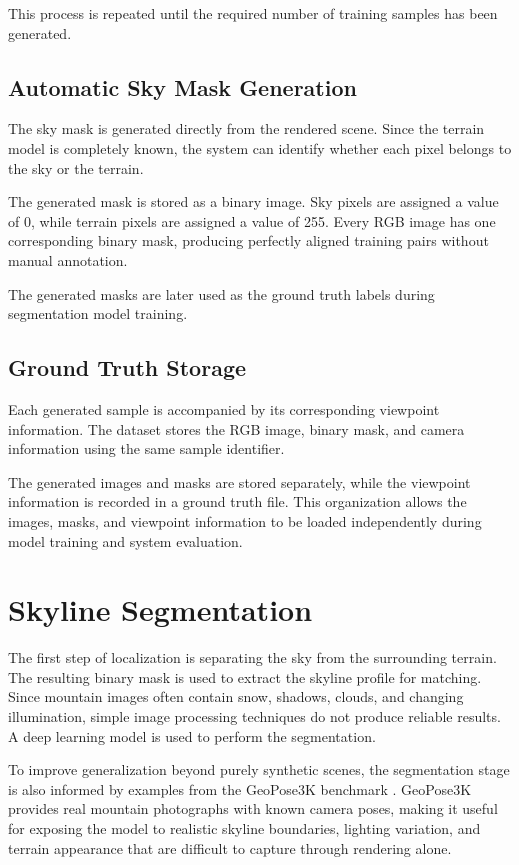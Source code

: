 This process is repeated until the required number of training samples has been generated.

\subsection{Automatic Sky Mask Generation}

The sky mask is generated directly from the rendered scene. Since the terrain model is completely known, the system can identify whether each pixel belongs to the sky or the terrain.

The generated mask is stored as a binary image. Sky pixels are assigned a value of 0, while terrain pixels are assigned a value of 255. Every RGB image has one corresponding binary mask, producing perfectly aligned training pairs without manual annotation.

The generated masks are later used as the ground truth labels during segmentation model training.

\subsection{Ground Truth Storage}

Each generated sample is accompanied by its corresponding viewpoint information. The dataset stores the RGB image, binary mask, and camera information using the same sample identifier.

The generated images and masks are stored separately, while the viewpoint information is recorded in a ground truth file. This organization allows the images, masks, and viewpoint information to be loaded independently during model training and system evaluation.

\section{Skyline Segmentation}

The first step of localization is separating the sky from the surrounding terrain. The resulting binary mask is used to extract the skyline profile for matching. Since mountain images often contain snow, shadows, clouds, and changing illumination, simple image processing techniques do not produce reliable results. A deep learning model is used to perform the segmentation.

To improve generalization beyond purely synthetic scenes, the segmentation stage is also informed by examples from the GeoPose3K benchmark \cite{brejcha2017geopose3k}. GeoPose3K provides real mountain photographs with known camera poses, making it useful for exposing the model to realistic skyline boundaries, lighting variation, and terrain appearance that are difficult to capture through rendering alone.

